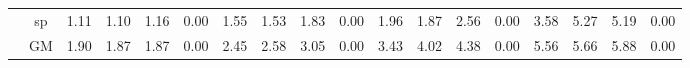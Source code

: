\begin{table*}[]
\begin{center}
{\begin{tabular}{|c|c|rrrr|rrrr|rrrr|rrrr|}
 &  sp  &  1.11  & \cellcolor{blue!25} 1.10  &  1.16  &  0.00  &  1.55  & \cellcolor{blue!25} 1.53  &  1.83  &  0.00  &  1.96  & \cellcolor{blue!25} 1.87  &  2.56  &  0.00  &  3.58  &  5.27  & \cellcolor{blue!25} 5.19  &  0.00 \\ \cline{2-18}
 &  GM  &  1.90  & \cellcolor{blue!25} 1.87  &  1.87  &  0.00  &  2.45  &  2.58  &  3.05  &  0.00  &  3.43  &  4.02  &  4.38  &  0.00  &  5.56  &  5.66  &  5.88  &  0.00 \\
\hline 
\end{tabular} }
\end{center}
\end{table*}
